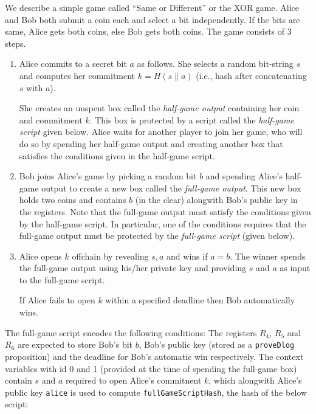 \documentclass[11pt]{article}
\newcommand{\langname}{ErgoScript\xspace}
\begin{document}
We describe a simple game called ``Same or Different'' or the XOR game. Alice and Bob both submit a coin each and select a bit independently. If the bits are same, Alice gets both coins, else Bob gets both coins. The game consists of 3 steps. 
\begin{enumerate}
	\item Alice commits to a secret bit $a$ as follows. She selects a random bit-string $s$ and computes her commitment $k = H(s\|a)$ (i.e., hash after concatenating $s$ with $a$).
	
	She creates an unspent box called the {\em half-game output} containing her coin and commitment $k$. This box is protected by a script called the {\em half-game script}  given below. Alice waits for another player to join her game, who will do so by spending her half-game output and creating another box that satisfies the conditions given in the half-game script. %
	
	\item Bob joins Alice's game by picking a random bit $b$ and spending Alice's half-game output to create a new box called the {\em full-game output}. This new box  holds two coins and contains $b$ (in the clear) alongwith Bob's public key in the registers. 
	Note that the full-game output must satisfy the conditions given by the half-game script. In particular, one of the conditions requires that the full-game output must be protected by the {\em full-game script} (given below).
	\item Alice opens $k$ offchain by revealing $s, a$ and wins if $a = b$. The winner spends the full-game output using his/her private key and providing $s$ and $a$ as input to the full-game script.

	If Alice fails to open $k$ within a specified deadline then Bob automatically wins. 
\end{enumerate}

The full-game script encodes the following conditions: The registers $R_4$, $R_5$ and $R_6$ are expected to store Bob's bit $b$, Bob's public key (stored as a \texttt{proveDlog} proposition) and the deadline for Bob's automatic win respectively. The context variables with id 0 and 1 (provided at the time of spending the full-game box) contain $s$ and $a$ required to open Alice's commitnent $k$, which alongwith Alice's public key \texttt{alice} is used to compute \texttt{fullGameScriptHash}, the hash of the below script: 
\end{document}

